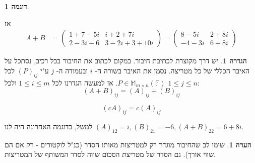\documentclass[12pt]{report}
\theoremstyle{plain}
\theoremstyle{definition}
\newtheorem{definition}[theorem]{הגדרה}
\newtheorem{example}{דוגמה}[chapter]
\newtheorem{remark}{הערה}[chapter]
\newcommand{\F}{\mathbb{F}}
\newcommand{\M}{\mathbb{M}}
\newcommand{\0}{\mathbf{0}}
\begin{document}
\begin{example}
\begin{enumerate}[label=\alph*.]
אז
$$
 \begin{aligned}
A+B&=\begin{pmatrix} 1+7-5i & i+2+7i \\
2-3i-6 & 3-2i+3+10i 
\end{pmatrix}=\begin{pmatrix} 8-5i & 2+8i \\
-4-3i & 6+8i 
\end{pmatrix}
\end{aligned}
$$

    \end{enumerate}
\end{example}

\begin{definition}\label{remark:entry-formula}
יש דרך מקוצרת לכתיבת חיבור. במקום לכתוב את החיבור בכל רכיב, נסתכל על האיבר הכללי של כל מטריצה. נסמן את האיבר בשורה ה-
$i$
ובעמודה ה-
$j$
ע"י
$(P)_{ij}$
לכל
$P\in\M_{m\times n}(\F)$. 
אז למעשה הגדרנו
לכל
$1\leq i \leq m$
ולכל
$1\leq j\leq n$:
$$(A+B)_{ij}=(A)_{ij}+(B)_{ij}$$

$$(c A)_{ij}=c(A)_{ij}$$

\end{definition}

למשל, בדוגמה האחרונה היה לנו
$(A)_{12} = i, (B)_{21} = -6, (A+B)_{22}=6+8i$.

\begin{remark}
שימו לב שהחיבור מוגדר רק למטריצות מאותו הסדר (כנ"ל לוקטורים - רק אם הם שווי אורך). גם הסדר של מטריצת הסכום שווה לסדר המשותף של המטריצות.
\end{remark}
\end{document}
